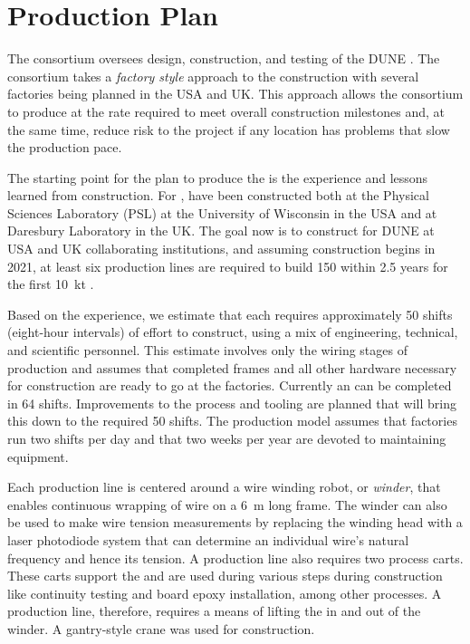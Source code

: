 \section{Production Plan}
\label{sec:fdsp-apa-prod}

The  consortium oversees design, construction, and testing of the DUNE  . %
The  consortium takes a \textit{factory style} approach to the construction with several factories being planned in the USA and UK. This approach allows the consortium to produce  at the rate required to meet overall construction milestones and, at the same time, reduce risk to the project if any location has problems that slow the production pace.

The starting point for the  plan to produce the  is the experience and lessons learned from  construction. For ,  have been constructed both at the Physical Sciences Laboratory (PSL) at the University of Wisconsin in the USA and at Daresbury Laboratory in the UK.  The goal now is to construct  for DUNE at USA and UK collaborating institutions, and assuming construction begins in 2021, at least six production lines are required to build \num{150}  within \num{2.5} years for the first %
\SI{10}{kt} .   

Based on the  experience, we estimate that each  requires approximately \num{50} shifts (eight-hour intervals) of effort to construct, using a mix of engineering, technical, and scientific personnel. This estimate involves only the wiring stages of production and assumes that completed frames and all other hardware necessary for construction are ready to go at the factories. Currently an  can be completed in \num{64} shifts. Improvements to the process and tooling are planned that will bring this down to the required \num{50} shifts. The production model assumes that factories run two shifts per day and that two weeks per year are devoted to maintaining equipment. 

Each production line is centered around a wire winding robot, or \textit{winder}, that enables continuous wrapping of wire on a \SI{6}{m} long frame. The winder can also be used to make wire tension measurements by replacing the winding head with a laser photodiode system that can determine an individual wire's natural frequency and hence its tension. A production line also requires two process carts. These carts support the  and are used during various steps during construction like continuity testing and board epoxy installation, among other processes. A production line, therefore, requires a means of lifting the  in and out of the winder. A gantry-style crane was used for  construction.

